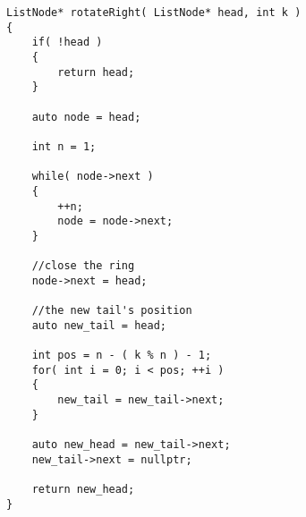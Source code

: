 \setcounter{lstlisting}{0}
\begin{lstlisting}[style=customc, caption={Direct Way}]
ListNode* rotateRight( ListNode* head, int k )
{
    if( !head )
    {
        return head;
    }

    auto node = head;

    int n = 1;

    while( node->next )
    {
        ++n;
        node = node->next;
    }

    //close the ring
    node->next = head;

    //the new tail's position
    auto new_tail = head;

    int pos = n - ( k % n ) - 1;
    for( int i = 0; i < pos; ++i )
    {
        new_tail = new_tail->next;
    }

    auto new_head = new_tail->next;
    new_tail->next = nullptr;

    return new_head;
}
\end{lstlisting}